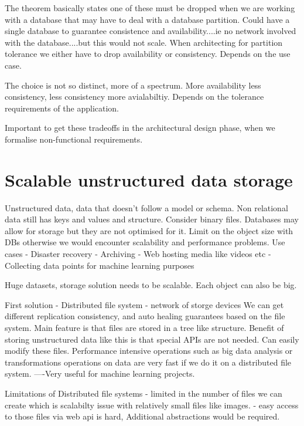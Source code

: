 \documentclass[a4paper, 11pt]{book}
\begin{document}
    The theorem basically states one of these must be dropped when we are working with a database that may have to deal with a database partition.
    Could have a single database to guarantee consistence and availability....ie no network involved with the database....but this would not scale.
    When architecting for partition tolerance we either have to drop availability or consistency.
    Depends on the use case.

    The choice is not so distinct, more of a spectrum.
    More availability less consistency, less consistency more avialabiltiy. Depends on the tolerance requirements of the application.

    Important to get these tradeoffs in the architectural design phase, when we formalise non-functional requirements.


    \section{Scalable unstructured data storage}
    Unstructured data, data that doesn't follow a model or schema. Non relational data still has keys and values and structure.
    Consider binary files.
    Databases may allow for storage but they are not optimised for it.
    Limit on the object size with DBs otherwise we would encounter scalability and performance problems.
    Use cases
    - Disaster recovery
    - Archiving
    - Web hosting media like videos etc
    - Collecting data points for machine learning purposes

    Huge datasets, storage solution needs to be scalable.
    Each object can also be big.

    First solution - Distributed file system - network of storge devices
    We can get different replication consistency, and auto healing guarantees based on the file system.
    Main feature is that files are stored in a tree like structure.
    Benefit of storing unstructured data like this is that special APIs are not needed.
    Can easily modify these files.
    Performance intensive operations such as big data analysis or transformations operations on data are very fast if we do it on a distributed file system.
    ----Very useful for machine learning projects.

    Limitations of Distributed file systems
    - limited in the number of files we can create which is scalabilty issue with relatively small files like images.
    - easy access to those files via web api is hard, Additional abstractions would be required.
\end{document}
